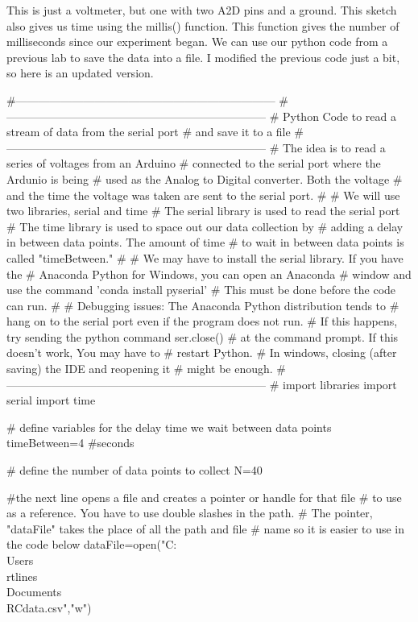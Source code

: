 This is just a voltmeter, but one with two A2D pins and a ground. This
sketch also gives us time using the millis() function. This function gives
the number of milliseconds since our experiment began. We can use our python
code from a previous lab to save the data into a file. I modified the
previous code just a bit, so here is an updated version.
 \begin{python}
#---------------------------------------------------------------------
#---------------------------------------------------------------------
# Python Code to read a stream of data from the serial port
#   and save it to a file
#---------------------------------------------------------------------
#   The idea is to read a series of voltages from an Arduino 
#   connected to the serial port where the Ardunio is being 
#   used as the Analog to Digital converter. Both the voltage
#   and the time the voltage was taken are sent to the serial port.
#
# We will use two libraries, serial and time
#   The serial library is used to read the serial port
#   The time library is used to space out our data collection by
#   adding a delay in between data points. The amount of time 
#   to wait in between data points is called "timeBetween." 
#
# We may have to install the serial library. If you have the
#   Anaconda Python for Windows, you can open an Anaconda 
#   window and use the command 'conda install pyserial'
#   This must be done before the code can run.
#
# Debugging issues:  The Anaconda Python distribution tends to 
#   hang on to the serial port even if the program does not run. 
#   If this happens, try sending the python command ser.close()
#   at the command prompt. If this doesn't work, You may have to 
#   restart Python.
#   In windows, closing (after saving) the IDE and reopening it 
#   might be enough.
#---------------------------------------------------------------------
# import libraries
import serial
import time
 
 
# define variables for the delay time we wait between data points
timeBetween=4 #seconds
 
# define the number of data points to collect
N=40
 
#the next line opens a file and creates a pointer or handle for that file
#  to use as a reference. You have to use double slashes in the path.
#  The pointer, "dataFile" takes the place of all the path and file
#  name so it is easier to use in the code below
dataFile=open("C:\\Users\\rtlines\\Documents\\RCdata.csv","w")
 

\end{python}
